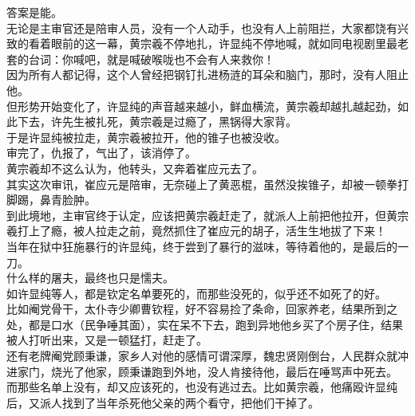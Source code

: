 \begin{multicols}{\theparacolNo}
答案是能。\\

无论是主审官还是陪审人员，没有一个人动手，也没有人上前阻拦，大家都饶有兴致的看着眼前的这一幕，黄宗羲不停地扎，许显纯不停地喊，就如同电视剧里最老套的台词：你喊吧，就是喊破喉咙也不会有人来救你！\\

因为所有人都记得，这个人曾经把钢钉扎进杨涟的耳朵和脑门，那时，没有人阻止他。\\

但形势开始变化了，许显纯的声音越来越小，鲜血横流，黄宗羲却越扎越起劲，如此下去，许先生被扎死，黄宗羲是过瘾了，黑锅得大家背。\\

于是许显纯被拉走，黄宗羲被拉开，他的锥子也被没收。\\

审完了，仇报了，气出了，该消停了。\\

黄宗羲却不这么认为，他转头，又奔着崔应元去了。\\

其实这次审讯，崔应元是陪审，无奈碰上了黄恶棍，虽然没挨锥子，却被一顿拳打脚踢，鼻青脸肿。\\

到此境地，主审官终于认定，应该把黄宗羲赶走了，就派人上前把他拉开，但黄宗羲打上了瘾，被人拉走之前，竟然抓住了崔应元的胡子，活生生地拔了下来！\\

当年在狱中狂施暴行的许显纯，终于尝到了暴行的滋味，等待着他的，是最后的一刀。\\

什么样的屠夫，最终也只是懦夫。\\

如许显纯等人，都是钦定名单要死的，而那些没死的，似乎还不如死了的好。\\

比如阉党骨干，太仆寺少卿曹钦程，好不容易捡了条命，回家养老，结果所到之处，都是口水（民争唾其面），实在呆不下去，跑到异地他乡买了个房子住，结果被人打听出来，又是一顿猛打，赶走了。\\

还有老牌阉党顾秉谦，家乡人对他的感情可谓深厚，魏忠贤刚倒台，人民群众就冲进家门，烧光了他家，顾秉谦跑到外地，没人肯接待他，最后在唾骂声中死去。\\

而那些名单上没有，却又应该死的，也没有逃过去。比如黄宗羲，他痛殴许显纯后，又派人找到了当年杀死他父亲的两个看守，把他们干掉了。\\


\end{multicols}
